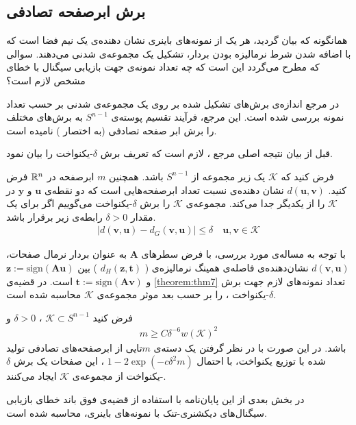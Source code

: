 \subsection{برش ابرصفحه تصادفی}
همانگونه که بیان گردید، هر یک از نمونه‌های باینری نشان دهنده‌ی یک نیم فضا است که با اضافه شدن شرط نرمالیزه بودن بردار، تشکیل یک مجموعه‌ی شدنی می‌دهند. سوالی که مطرح می‌گردد این است که چه تعداد نمونه‌ی جهت بازیابی سیگنال با خطای مشخص لازم است؟

در مرجع
\cite{plan2014dimension}
اندازه‌ی برش‌های تشکیل شده بر روی یک مجموعه‌ی شدنی بر حسب تعداد نمونه بررسی شده است. این مرجع، فرآیند تقسیم پوسته‌ی 
$S^{n-1}$
به برش‌های مختلف را برش ابر صفحه تصادفی
(به اختصار
)
نامیده است.


قبل از بیان نتیجه اصلی مرجع
\cite{plan2014dimension}
، لازم است که تعریف برش 
$ \delta $-یکنواخت
را بیان نمود.

\begin{definition}
\cite[تعریف~1.1]{plan2014dimension}
\label{defn:D-UT}
فرض کنید که 
$\mathcal{K}$
یک زیر مجموعه از
$ S^{n-1} $
باشد. همچنین
$m$
ابرصفحه در
$\mathbb{R}^{n}$
فرض کنید. 
$ d\left(\bm{u},\bm{v}\right) $
نشان دهنده‌ی نسبت تعداد ابرصفحه‌هایی است که دو نقطه‌ی 
$ \bm{u}$
و
$\bm{y}$
در
$\mathcal{K} $
را از یکدیگر جدا می‌کند. 
مجموعه‌ی 
$\mathcal{K}$
را برش
$ \delta $-یکنواخت
می‌گوییم اگر برای یک مقدار 
$\delta >0$
رابطه‌ی زیر برقرار باشد.
\begin{align}
\label{eq:eq24}
|d\left(\bm{v},\bm{u}\right)-d_{G}\left(\bm{v},\bm{u}\right) |\leq \delta \quad \bm{u},\bm{v} \in \mathcal{K}
\end{align}
\end{definition}

با توجه به مساله‌ی مورد بررسی، با فرض سطر‌های 
$\bm{A}$
به عنوان بردار نرمال صفحات، 
$d\left(\bm{v},\bm{u}\right)$
نشان‌دهنده‌ی فاصله‌ی همینگ نرمالیزه‌ی (
$ d_{H}\left(\bm{z},\bm{t}\right)  $
)
بین
$\bm{z}:= \text{sign}\left(\bm{A}\bm{u}\right)$
و
$\bm{t}:= \text{sign}\left(\bm{A}\bm{v}\right)$
است.  در قضیه‌ی
\eqref{theorem:thm7}
تعداد نمونه‌های لازم جهت برش
$ \delta $-یکنواخت
، را بر حسب بعد موثر مجموعه‌ی
$\mathcal{K}$
محاسبه شده است.
\begin{theorem}
\label{theorem:thm7}
\cite[قضیه~1.2]{plan2014dimension}
فرض کنید
$\mathcal{K}\subset S^{n-1}$
، 
$\delta>0$
و
\begin{align*}
	m \geq C \delta^{-6} w\left(\mathcal{K}\right)^{2}
\end{align*}
باشد.
در این صورت با در نظر گرفتن یک دسته‌ی 
$m$تایی
از ابرصفحه‌های تصادفی تولید شده با توزیع یکنواخت، با احتمال 
$1-2\exp(-c\delta^{2}m)$
، این صفحات یک برش
$ \delta $-یکنواخت
از  مجموعه‌ی 
$\mathcal{K}$
ایجاد می‌کنند. 
\end{theorem}
در بخش بعدی از این پایان‌نامه با استفاده از قضیه‌ی فوق باند خطای بازیابی سیگنال‌های دیکشنری-تنک با نمونه‌های باینری، محاسبه شده است. 












